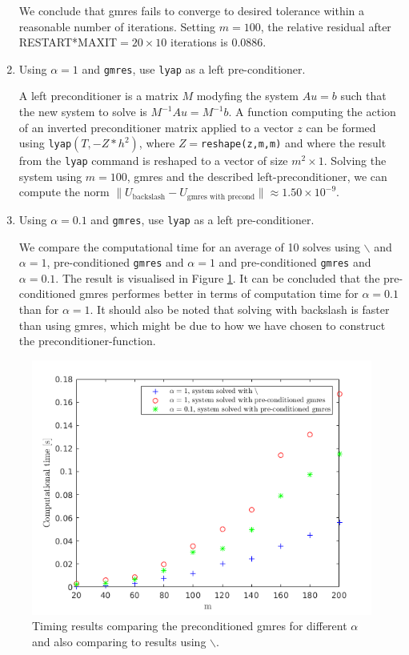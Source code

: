 \begin{enumerate}
We conclude that gmres fails to converge to desired tolerance within a reasonable number of iterations. Setting $m=100$, the relative residual after RESTART*MAXIT$=20\times 10$ iterations is 0.0886.
\item Using $\alpha = 1$ and \texttt{gmres}, use \texttt{lyap} as a left pre-conditioner. 

A left preconditioner is a matrix $M$ modyfing  the system $Au = b$ such that the new system to solve is $M^{-1}Au = M^{-1}b$. A function computing the action of an inverted preconditioner matrix applied to a vector $z$ can be formed using \texttt{lyap}$(T,-Z*h^2)$, where $Z=$\texttt{reshape(z,m,m)} and where the result from the \texttt{lyap} command is reshaped to a vector of size $m^2\times 1$. Solving the system using $m=100$, gmres and the described left-preconditioner, we can compute the norm $\|U_{\text{backslash}}-U_{\text{gmres with precond}}\| \approx 1.50\times 10^{-9}$.

\item Using $\alpha = 0.1$ and \texttt{gmres}, use \texttt{lyap} as a left pre-conditioner. 

We compare the computational time for an average of 10 solves using $\backslash$ and $\alpha = 1$, pre-conditioned \texttt{gmres} and $\alpha=1$ and pre-conditioned \texttt{gmres} and $\alpha = 0.1$. The result is visualised in Figure \ref{time12_2}. It can be concluded that the pre-conditioned gmres performes better in terms of computation time for $\alpha = 0.1$ than for $\alpha = 1$. It should also be noted that solving with backslash is faster than using gmres, which might be due to how we have chosen to construct the preconditioner-function.
\end{enumerate}
\begin{figure}[h!]
\centering
\includegraphics[scale=0.6]{time_gmres.png}
\caption{Timing results comparing the preconditioned gmres for different $\alpha$ and also comparing to results using $\backslash$.}
\label{time12_2}
\end{figure}

